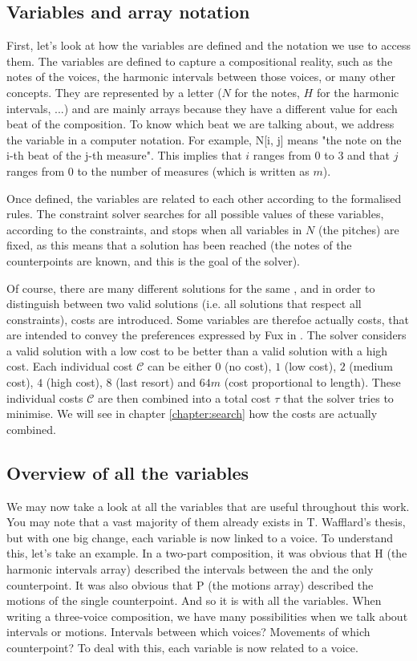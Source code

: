 \subsection{Variables and array notation} \label{Wafflard-variables}
First, let's look at how the variables are defined and the notation we use to access them. The variables are defined to capture a compositional reality, such as the notes of the voices, the harmonic intervals between those voices, or many other concepts. They are represented by a letter ($N$ for the notes, $H$ for the harmonic intervals, ...) and are mainly arrays because they have a different value for each beat of the composition. To know which beat we are talking about, we address the variable in a computer notation. For example, N[i, j] means "the note on the i-th beat of the j-th measure". This implies that $i$ ranges from $0$ to $3$ and that $j$ ranges from $0$ to the number of measures (which is written as $m$).

Once defined, the variables are related to each other according to the formalised rules. The constraint solver searches for all possible values of these variables, according to the constraints, and stops when all variables in $N$ (the pitches) are fixed, as this means that a solution has been reached (the notes of the counterpoints are known, and this is the goal of the solver).

Of course, there are many different solutions for the same \cf, and in order to distinguish between two valid solutions (i.e. all solutions that respect all constraints), costs are introduced. Some variables are therefoe actually costs, that are intended to convey the preferences expressed by Fux in \gap. The solver considers a valid solution with a low cost to be better than a valid solution with a high cost. Each individual cost $\mathcal{C}$ can be either $0$ (no cost), $1$ (low cost), $2$ (medium cost), $4$ (high cost), $8$ (last resort) and $64m$ (cost proportional to length). These individual costs $\mathcal{C}$  are then combined into a total cost $\tau$  that the solver tries to minimise. We will see in chapter \ref{chapter:search} how the costs are actually combined.


\subsection{Overview of all the variables}
We may now take a look at all the variables that are useful throughout this work. You may note that a vast majority of them already exists in T. Wafflard's thesis, but with one big change, each variable is now linked to a voice. To understand this, let's take an example. In a two-part composition, it was obvious that H (the harmonic intervals array) described the intervals between the \cfs and the only counterpoint. It was also obvious that P (the motions array) described the motions of the single counterpoint. And so it is with all the variables. When writing a three-voice composition, we have many possibilities when we talk about intervals or motions. Intervals between which voices? Movements of which counterpoint? To deal with this, each variable is now related to a voice.


